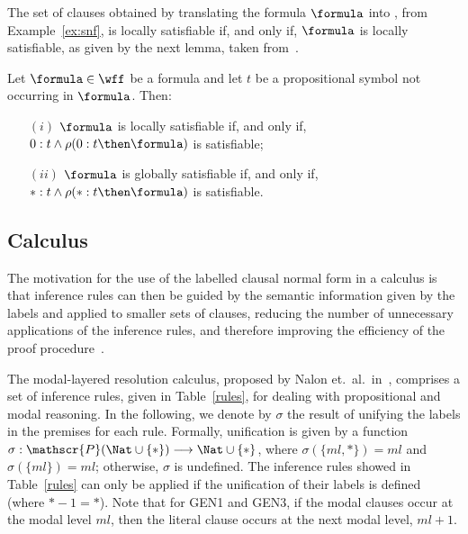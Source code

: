 The set of clauses obtained by translating the formula $\formula$ into
, from Example~\ref{ex:snf}, is locally satisfiable if, and only
if, $\formula$ is locally satisfiable, as given by the next lemma, taken
from~\cite{nalon2015modal}.%

\begin{lemma}
    Let $\formula \in \wff$ be a formula and let $t$ be a propositional symbol
    not occurring in $\formula$. Then: 
    \begin{enumerate}
        \item[$(i)$] $\formula$ is locally satisfiable if, and only if, $0 : t \land \rho(0 : t \then \formula)$ is satisfiable;
        \item[$(ii)$] $\formula$ is globally satisfiable if, and only if, $* : t \land \rho(* : t \then \formula)$ is satisfiable.
    \end{enumerate}
\end{lemma}

\subsection{Calculus}%
\label{sec:calc}

The motivation for the use of the labelled clausal normal form in a calculus is
that inference rules can then be guided by the semantic information given by the
labels and applied to smaller sets of clauses, reducing the number of
unnecessary applications of the inference rules, and therefore improving the efficiency of the proof
procedure~\cite{Nalon2016}. 

The modal-layered resolution calculus, proposed by Nalon et.\ al.\
in~\cite{nalon2015modal}, comprises a set of inference rules, given in
Table~\ref{rules}, for dealing with propositional and modal reasoning. In the
following, we denote by $\sigma$ the result of unifying the labels in the
premises for each rule.  Formally, unification is given by a function $ \sigma :
\mathscr{P}(\Nat \cup \{*\}) \longrightarrow \Nat \cup \{*\}$, where $\sigma
(\{ml, *\}) = ml$ and $\sigma (\{ml\}) = ml$; otherwise, $\sigma$ is undefined.
The inference rules showed in Table~\ref{rules} can only be applied if the
unification of their labels is defined (where $* - 1 = *$). Note that for GEN1
and GEN3, if the modal clauses occur at the modal level $ml$, then the literal
clause occurs at the next modal level, $ml + 1$.

